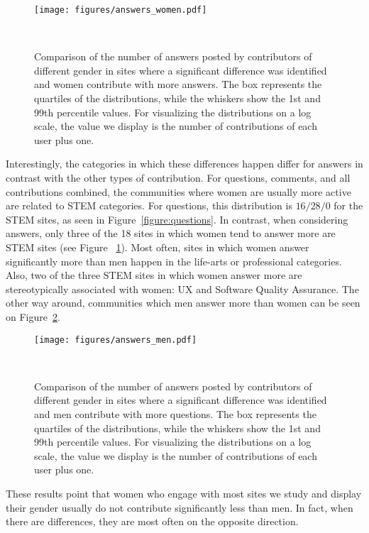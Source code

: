 \begin{figure}
  \raggedleft
  \texttt{[image: figures/answers\_women.pdf]}
  \caption{Comparison of the number of answers posted by contributors of different gender in sites where a significant difference was identified and women contribute with more answers. The box represents the quartiles of the distributions, while the whiskers show the 1st and 99th percentile values. For visualizing the distributions on a log scale, the value we display is the number of contributions of each user plus one. }~\label{figure:answers}
\end{figure}

Interestingly, the categories in which these differences happen differ for answers in contrast with the other types of contribution. For questions, comments, and all contributions combined, the communities where women are usually more active are related to STEM categories. For questions, this distribution is $16/28/0$ for the STEM sites, as seen in Figure~\ref{figure:questions}. In contrast, when considering answers, only three of the 18 sites in which women tend to answer more are STEM sites (see Figure ~\ref{figure:answers}). Most often, sites in which women answer significantly more than men happen in the life-arts or professional categories. Also, two of the three STEM sites in which women answer more are stereotypically associated with women: UX and Software Quality Assurance. The other way around, communities which men answer more than women can be seen on Figure~\ref{figure:answers-men}.

\begin{figure}
  \raggedleft
  \texttt{[image: figures/answers\_men.pdf]}
  \caption{Comparison of the number of answers posted by contributors of different gender in sites where a significant difference was identified and men contribute with more questions. The box represents the quartiles of the distributions, while the whiskers show the 1st and 99th percentile values. For visualizing the distributions on a log scale, the value we display is the number of contributions of each user plus one. }~\label{figure:answers-men}
\end{figure}

These results point that women who engage with most sites we study and display their gender usually do not contribute significantly less than men. In fact, when there are differences, they are most often on the opposite direction. 

